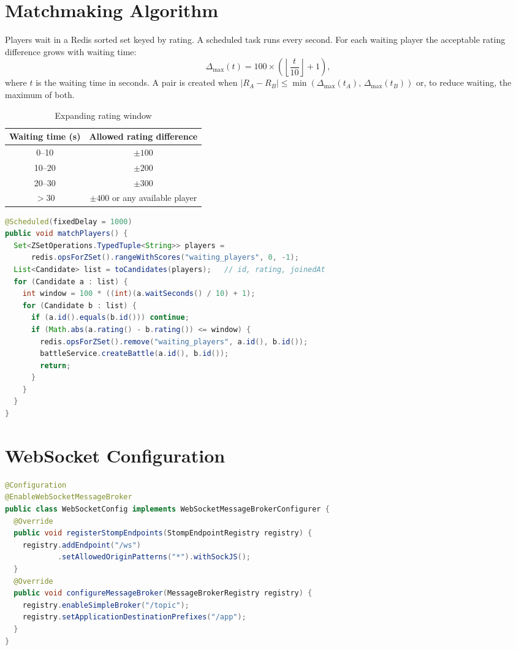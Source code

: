 \documentclass[12pt,a4paper,oneside]{report}
\begin{document}
\section{Matchmaking Algorithm}
Players wait in a Redis sorted set keyed by rating. A scheduled task runs every second. For each waiting
player the acceptable rating difference grows with waiting time:
\[
  \Delta_{\max}(t) = 100 \times \left(\left\lfloor \frac{t}{10} \right\rfloor + 1\right),
\]
where $t$ is the waiting time in seconds. A pair is created when
$|R_A - R_B| \le \min(\Delta_{\max}(t_A),\,\Delta_{\max}(t_B))$ or, to reduce waiting, the maximum of both.

\begin{table}[H]
\centering
\small
\begin{tabular}{@{}cc@{}}
\toprule
\textbf{Waiting time (s)} & \textbf{Allowed rating difference} \\
\midrule
0--10  & $\pm 100$ \\
10--20 & $\pm 200$ \\
20--30 & $\pm 300$ \\
$>30$  & $\pm 400$ or any available player \\
\bottomrule
\end{tabular}
\caption{Expanding rating window}
\end{table}

\begin{lstlisting}[language=Java,caption={Matchmaking scheduler (simplified)}]
@Scheduled(fixedDelay = 1000)
public void matchPlayers() {
  Set<ZSetOperations.TypedTuple<String>> players =
      redis.opsForZSet().rangeWithScores("waiting_players", 0, -1);
  List<Candidate> list = toCandidates(players);   // id, rating, joinedAt
  for (Candidate a : list) {
    int window = 100 * ((int)(a.waitSeconds() / 10) + 1);
    for (Candidate b : list) {
      if (a.id().equals(b.id())) continue;
      if (Math.abs(a.rating() - b.rating()) <= window) {
        redis.opsForZSet().remove("waiting_players", a.id(), b.id());
        battleService.createBattle(a.id(), b.id());
        return;
      }
    }
  }
}
\end{lstlisting}

\section{WebSocket Configuration}
\begin{lstlisting}[language=Java,caption={STOMP over WebSocket configuration}]
@Configuration
@EnableWebSocketMessageBroker
public class WebSocketConfig implements WebSocketMessageBrokerConfigurer {
  @Override
  public void registerStompEndpoints(StompEndpointRegistry registry) {
    registry.addEndpoint("/ws")
            .setAllowedOriginPatterns("*").withSockJS();
  }
  @Override
  public void configureMessageBroker(MessageBrokerRegistry registry) {
    registry.enableSimpleBroker("/topic");
    registry.setApplicationDestinationPrefixes("/app");
  }
}
\end{lstlisting}
\end{document}
